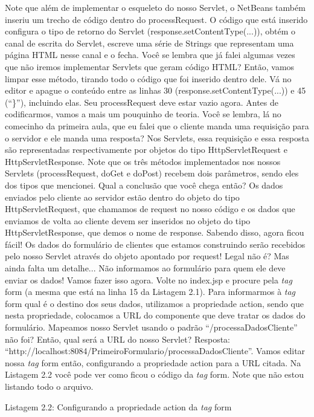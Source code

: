 Note que além de implementar o esqueleto do nosso Servlet, o NetBeans também inseriu um trecho de código dentro do processRequest. O código que está inserido configura o tipo de retorno do Servlet (response.setContentType(...)), obtém o canal de escrita do Servlet, escreve uma série de Strings que representam uma página HTML nesse canal e o fecha. Você se lembra que já falei algumas vezes que não iremos implementar Servlets que geram código HTML? Então, vamos limpar esse método, tirando todo o código que foi inserido dentro dele. Vá no editor e apague o conteúdo entre as linhas 30 (response.setContentType(...)) e 45 (``\}''), incluindo elas. Seu processRequest deve estar vazio agora.
Antes de codificarmos, vamos a mais um pouquinho de teoria. Você se lembra, lá no comecinho da primeira aula, que eu falei que o cliente manda uma requisição para o servidor e ele manda uma resposta? Nos Servlets, essa requisição e essa resposta são representadas respectivamente por objetos do tipo HttpServletRequest e HttpServletResponse. Note que os três métodos implementados nos nossos Servlets (processRequest, doGet e doPost) recebem dois parâmetros, sendo eles dos tipos que mencionei. Qual a conclusão que você chega então? Os dados enviados pelo cliente ao servidor estão dentro do objeto do tipo HttpServletRequest, que chamamos de request no nosso código e os dados que enviamos de volta ao cliente devem ser inseridos no objeto do tipo HttpServletResponse, que demos o nome de response.
Sabendo disso, agora ficou fácil! Os dados do formulário de clientes que estamos construindo serão recebidos pelo nosso Servlet através do objeto apontado por request! Legal não é? Mas ainda falta um detalhe... Não informamos ao formulário para quem ele deve enviar os dados! Vamos fazer isso agora. Volte no index.jsp e procure pela \textit{tag} form (a mesma que está na linha 15 da Listagem 2.1). Para informarmos à \textit{tag} form qual é o destino dos seus dados, utilizamos a propriedade action, sendo que nesta propriedade, colocamos a URL do componente que deve tratar os dados do formulário. Mapeamos nosso Servlet usando o padrão ``/processaDadosCliente'' não foi? Então, qual será a URL do nosso Servlet? Resposta: ``http://localhost:8084/PrimeiroFormulario/processaDadosCliente''. Vamos editar nossa \textit{tag} form então, configurando a propriedade action para a URL citada. Na Listagem 2.2 você pode ver como ficou o código da \textit{tag} form. Note que não estou listando todo o arquivo.

Listagem 2.2: Configurando a propriedade action da \textit{tag} form
 
